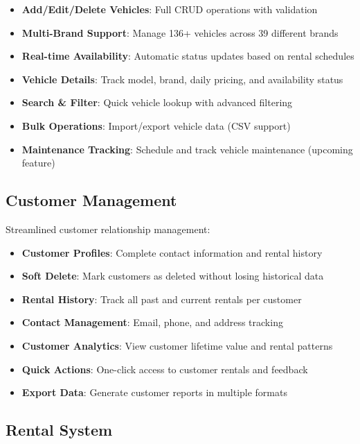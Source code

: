 \documentclass[12pt,a4paper]{article}
\begin{document}
\begin{itemize}[leftmargin=*]
    \item \textbf{Add/Edit/Delete Vehicles}: Full CRUD operations with validation
    \item \textbf{Multi-Brand Support}: Manage 136+ vehicles across 39 different brands
    \item \textbf{Real-time Availability}: Automatic status updates based on rental schedules
    \item \textbf{Vehicle Details}: Track model, brand, daily pricing, and availability status
    \item \textbf{Search \& Filter}: Quick vehicle lookup with advanced filtering
    \item \textbf{Bulk Operations}: Import/export vehicle data (CSV support)
    \item \textbf{Maintenance Tracking}: Schedule and track vehicle maintenance (upcoming feature)
\end{itemize}

\subsection{Customer Management}

Streamlined customer relationship management:

\begin{itemize}[leftmargin=*]
    \item \textbf{Customer Profiles}: Complete contact information and rental history
    \item \textbf{Soft Delete}: Mark customers as deleted without losing historical data
    \item \textbf{Rental History}: Track all past and current rentals per customer
    \item \textbf{Contact Management}: Email, phone, and address tracking
    \item \textbf{Customer Analytics}: View customer lifetime value and rental patterns
    \item \textbf{Quick Actions}: One-click access to customer rentals and feedback
    \item \textbf{Export Data}: Generate customer reports in multiple formats
\end{itemize}

\subsection{Rental System}
\end{document}
